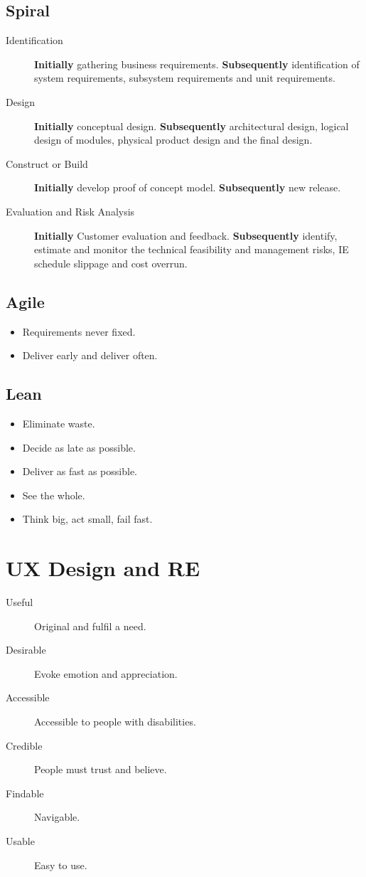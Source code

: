 \documentclass[landscape]{cheat}
\begin{document}
\begin{multicols}{3}
\subsection{Spiral}
\begin{description}
    \item[Identification] \textbf{Initially} gathering business requirements.
        \textbf{Subsequently} identification of system requirements, subsystem requirements and unit requirements.
    \item[Design] \textbf{Initially} conceptual design.
        \textbf{Subsequently} architectural design, logical design of modules, physical product design and the final design.
    \item[Construct or Build] \textbf{Initially} develop proof of concept model.
        \textbf{Subsequently} new release.
    \item[Evaluation and Risk Analysis] \textbf{Initially} Customer evaluation and feedback.
        \textbf{Subsequently} identify, estimate and monitor the technical feasibility and management risks, IE schedule slippage and cost overrun.
\end{description}

\subsection{Agile}
\begin{itemize}
    \item Requirements never fixed.
    \item Deliver early and deliver often.
\end{itemize}

\subsection{Lean}
\begin{itemize}
    \item Eliminate waste.
    \item Decide as late as possible.
    \item Deliver as fast as possible.
    \item See the whole.
    \item Think big, act small, fail fast.
\end{itemize}

\section{UX Design and RE}
\begin{description}
    \item[Useful] Original and fulfil a need.
    \item[Desirable] Evoke emotion and appreciation.
    \item[Accessible] Accessible to people with disabilities.
    \item[Credible] People must trust and believe.
    \item[Findable] Navigable.
    \item[Usable] Easy to use.
\end{description}


\end{multicols}
\end{document}
